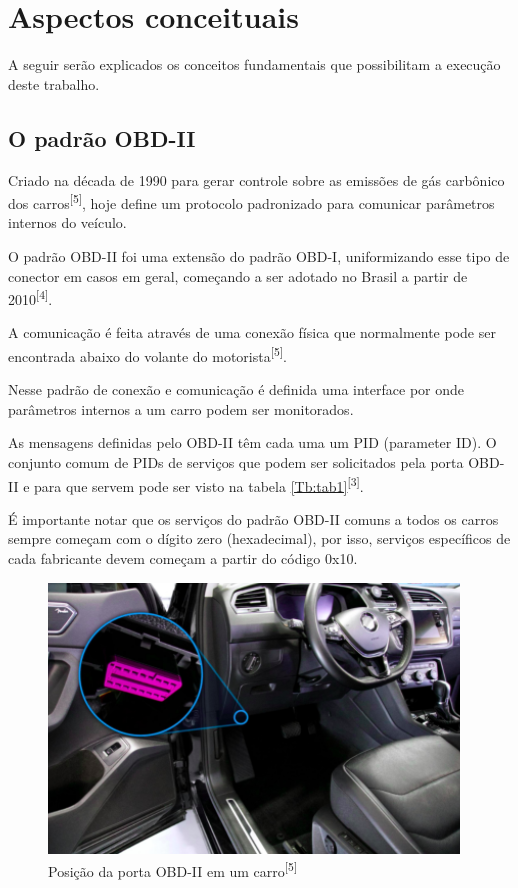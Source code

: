\chapter{Aspectos conceituais}
\label{CAP2}

A seguir serão explicados os conceitos fundamentais que possibilitam a execução deste trabalho. 


\section{O padrão OBD-II}

Criado na década de 1990 para gerar controle sobre as emissões de gás carbônico dos carros\textsuperscript{[5]}, hoje define um protocolo padronizado para comunicar parâmetros internos do veículo.
    
O padrão OBD-II foi uma extensão do padrão OBD-I, uniformizando esse tipo de conector em casos em geral, começando a ser adotado no Brasil a partir de 2010\textsuperscript{[4]}.

A comunicação é feita através de uma conexão física que normalmente pode ser encontrada abaixo do volante do motorista\textsuperscript{[5]}.

Nesse padrão de conexão e comunicação é definida uma interface por onde parâmetros internos a um carro podem ser monitorados.

As mensagens definidas pelo OBD-II têm cada uma um PID (parameter ID). O conjunto comum de PIDs de serviços que podem ser solicitados pela porta OBD-II e para que servem pode ser visto na tabela \ref{Tb:tab1}\textsuperscript{[3]}.



É importante notar que os serviços do padrão OBD-II comuns a todos os carros sempre começam com o dígito zero (hexadecimal), por isso, serviços específicos de cada fabricante devem começam a partir do código 0x10.

\begin{figure}[hp]
    \centering
    
    \includegraphics[]{figures/localizacao_obd2.png}
    
    \caption{Posição da porta OBD-II em um carro\textsuperscript{[5]}}
\end{figure}

